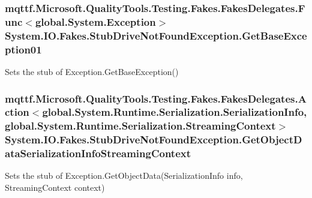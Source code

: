 \hypertarget{class_system_1_1_i_o_1_1_fakes_1_1_stub_drive_not_found_exception_a7160695e2f4928b45663821d9b836261}{
\subsubsection[{Get\-Base\-Exception01}]{\setlength{\rightskip}{0pt plus 5cm}mqttf.\-Microsoft.\-Quality\-Tools.\-Testing.\-Fakes.\-Fakes\-Delegates.\-Func$<$global.\-System.\-Exception$>$ System.\-I\-O.\-Fakes.\-Stub\-Drive\-Not\-Found\-Exception.\-Get\-Base\-Exception01}}\label{class_system_1_1_i_o_1_1_fakes_1_1_stub_drive_not_found_exception_a7160695e2f4928b45663821d9b836261}


Sets the stub of Exception.\-Get\-Base\-Exception()

\hypertarget{class_system_1_1_i_o_1_1_fakes_1_1_stub_drive_not_found_exception_aaabef344c204502a7abdcc6cb026f7c0}{
\subsubsection[{Get\-Object\-Data\-Serialization\-Info\-Streaming\-Context}]{\setlength{\rightskip}{0pt plus 5cm}mqttf.\-Microsoft.\-Quality\-Tools.\-Testing.\-Fakes.\-Fakes\-Delegates.\-Action$<$global.\-System.\-Runtime.\-Serialization.\-Serialization\-Info, global.\-System.\-Runtime.\-Serialization.\-Streaming\-Context$>$ System.\-I\-O.\-Fakes.\-Stub\-Drive\-Not\-Found\-Exception.\-Get\-Object\-Data\-Serialization\-Info\-Streaming\-Context}}\label{class_system_1_1_i_o_1_1_fakes_1_1_stub_drive_not_found_exception_aaabef344c204502a7abdcc6cb026f7c0}


Sets the stub of Exception.\-Get\-Object\-Data(\-Serialization\-Info info, Streaming\-Context context)

